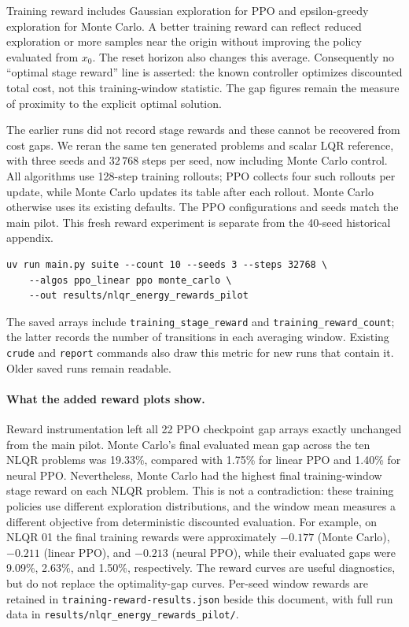 \documentclass[11pt]{article}
\begin{document}
Training reward includes Gaussian exploration for PPO and epsilon-greedy exploration
for Monte Carlo. A better training reward can reflect reduced exploration or more
samples near the origin without improving the policy evaluated from $x_0$. The
reset horizon also changes this average. Consequently no ``optimal stage reward''
line is asserted: the known controller optimizes discounted total cost, not this
training-window statistic. The gap figures remain the measure of proximity to the
explicit optimal solution.

The earlier runs did not record stage rewards and these cannot be recovered from
cost gaps. We reran the same ten generated problems and scalar LQR reference, with
three seeds and $32\,768$ steps per seed, now including Monte Carlo control.
All algorithms use 128-step training rollouts; PPO collects four such rollouts per
update, while Monte Carlo updates its table after each rollout. Monte Carlo otherwise
uses its existing defaults. The PPO configurations and seeds match the main pilot.
This fresh reward experiment is separate from the 40-seed historical appendix.
\begin{verbatim}
uv run main.py suite --count 10 --seeds 3 --steps 32768 \
    --algos ppo_linear ppo monte_carlo \
    --out results/nlqr_energy_rewards_pilot
\end{verbatim}
The saved arrays include \texttt{training\_stage\_reward} and
\texttt{training\_reward\_count}; the latter records the number of transitions in each
averaging window. Existing \texttt{crude} and \texttt{report} commands also draw this
metric for new runs that contain it. Older saved runs remain readable.

\paragraph{What the added reward plots show.}
Reward instrumentation left all 22 PPO checkpoint gap arrays exactly unchanged from
the main pilot. Monte Carlo's final evaluated mean gap across the ten NLQR problems
was 19.33\%, compared with 1.75\% for linear PPO and 1.40\% for neural PPO.
Nevertheless, Monte Carlo had the highest final training-window stage reward on
each NLQR problem. This is not a contradiction: these training policies use different
exploration distributions, and the window mean measures a different objective from
deterministic discounted evaluation. For example, on NLQR 01 the final training
rewards were approximately $-0.177$ (Monte Carlo), $-0.211$ (linear PPO), and $-0.213$
(neural PPO), while their evaluated gaps were 9.09\%, 2.63\%, and 1.50\%, respectively.
The reward curves are useful diagnostics, but do not replace the optimality-gap curves.
Per-seed window rewards are retained in \texttt{training-reward-results.json} beside
this document, with full run data in \texttt{results/nlqr\_energy\_rewards\_pilot/}.
\end{document}
